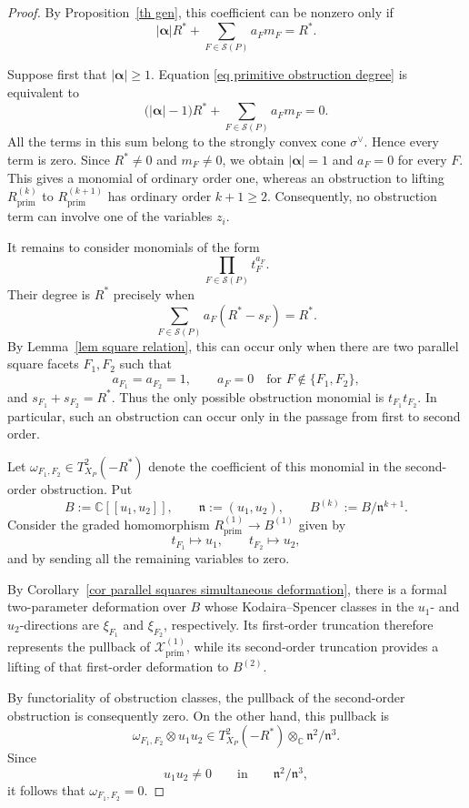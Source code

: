 \documentclass[11pt]{amsart}
\numberwithin{equation}{section}
\theoremstyle{plain}
\theoremstyle{definition}
\newcommand{\0}{$0$-mutable}
\newcommand{\CC}{\ensuremath{\mathbb{C}}}
\renewcommand{\1}{$1$-rigid}
\renewcommand{\0}{$0$-mutable}
\begin{document}
\begin{proof}
By Proposition~\ref{th gen}, this coefficient can be nonzero only if
\begin{equation}
\label{eq primitive obstruction degree}
|\boldsymbol\alpha|R^*
+
\sum_{F\in\mathcal S(P)}a_Fm_F
=
R^*.
\end{equation}

Suppose first that
$
|\boldsymbol\alpha|\geq1.
$
{Equation
\eqref{eq primitive obstruction degree} is equivalent to} 
\[
\bigl(|\boldsymbol\alpha|-1\bigr)R^*
+
\sum_{F\in\mathcal S(P)}a_Fm_F
=
0.
\]
All the terms in this sum belong to the strongly convex cone
\(\sigma^\vee\). Hence every term is zero. Since
$R^*\neq0$ and
$m_F\neq0$,
we obtain
$
|\boldsymbol\alpha|=1$
and
$a_F=0$
for every \(F\). This gives a monomial of ordinary order one, whereas
an obstruction to lifting
\(R_{\mathrm{prim}}^{(k)}\) to
\(R_{\mathrm{prim}}^{(k+1)}\) has ordinary order \(k+1\geq2\).
Consequently, no obstruction term can involve one of the variables
\(z_i\).

It remains to consider monomials of the form
\[
\prod_{F\in\mathcal S(P)}t_F^{a_F}.
\]
Their degree is \(R^*\) precisely when
\[
\sum_{F\in\mathcal S(P)}
a_F(R^*-s_F)
=
R^*.
\]
By Lemma~\ref{lem square relation}, this can occur only when there are
two parallel square facets \(F_1,F_2\) such that
\[
a_{F_1}=a_{F_2}=1,
\qquad
a_F=0
\quad
\text{for }F\notin\{F_1,F_2\},
\]
and
$
s_{F_1}+s_{F_2}=R^*.
$
Thus the only possible obstruction monomial is
$
t_{F_1}t_{F_2}.
$
In particular, such an obstruction can occur only in the passage from
first to second order.

Let
$
\omega_{F_1,F_2}
\in T^2_{X_P}(-R^*)
$
denote the coefficient of this monomial in the second-order
obstruction. Put
\[
B:=\CC[[u_1,u_2]],
\qquad
\mathfrak n:=(u_1,u_2),
\qquad
B^{(k)}:=B/\mathfrak n^{k+1}.
\]
Consider the graded homomorphism
$
R_{\mathrm{prim}}^{(1)}
\longrightarrow
B^{(1)}
$
given by
\[
t_{F_1}\longmapsto u_1,
\qquad
t_{F_2}\longmapsto u_2,
\]
and by sending all the remaining variables to zero.

By Corollary~\ref{cor parallel squares simultaneous deformation},
there is a formal two-parameter deformation over \(B\) whose
Kodaira--Spencer classes in the \(u_1\)- and \(u_2\)-directions are
\(\xi_{F_1}\) and \(\xi_{F_2}\), respectively. Its first-order
truncation therefore represents the pullback of
\(\mathcal X_{\mathrm{prim}}^{(1)}\), while its second-order
truncation provides a lifting of that first-order deformation to
\(B^{(2)}\).

By functoriality of obstruction classes, the pullback of the
second-order obstruction is consequently zero. On the other hand,
this pullback is
\[
\omega_{F_1,F_2}\otimes u_1u_2
\in
T^2_{X_P}(-R^*)\otimes_{\CC}
\mathfrak n^2/\mathfrak n^3.
\]
Since
\[
u_1u_2\neq0
\qquad\text{in}\qquad
\mathfrak n^2/\mathfrak n^3,
\]
it follows that
$
\omega_{F_1,F_2}=0.
$


\end{proof}
\end{document}
